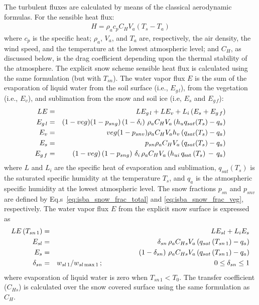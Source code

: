 The turbulent fluxes are calculated by means of the classical
aerodynamic formulas.  For the sensible heat flux:
\begin{eqnarray}
H = \rho_a c_p C_H V_a (T_s - T_a) \label{eqnH}
\end{eqnarray}
where $c_p$ is the specific heat; $\rho_a$, $V_a$, and $T_a$
are, respectively, the air density, the wind speed, and the
temperature at the lowest atmospheric level; and $C_H$,
as discussed below, is the
drag coefficient depending upon the thermal stability of the
atmosphere. The explicit snow scheme sensible heat flux
is calculated using the same formulation (but with $T_{sn}$).
The water vapor flux $E$ is the sum of the evaporation
of liquid water
from the soil surface (i.e., $E_{g\,l}$), from the vegetation (i.e., $E_v$),
and sublimation from the snow and soil ice (i.e, $E_s$ and $E_{g\,f}$):
%
\begin{eqnarray}
LE &=& LE_{g\,l} + LE_v + L_i \left(E_s + E_{g\,f}\right) \\
E_{g\,l} &=& (1-veg)(1-p_{sng})\left(1-\delta_i\right)\, \rho_a C_H V_a
        \left( h_u q_{sat}(T_s) - q_a \right) \label{eqnLEG} \\
E_v &=& veg (1-p_{snv}) \rho_a C_H V_a h_v
        \left( q_{sat}(T_s) - q_a \right) \\
E_s &=& p_{sn} \rho_a C_H V_a
        \left( q_{sat}(T_s) - q_a \right) \\
E_{g\,f} &=&
\,\left(1-veg\right)\left(1-p_{sng}\right)\,\delta_i\, \rho_a C_H V_a
\left( h_{ui} \,q_{\rm sat}\left(T_s\right) \,-\, q_a \right)
\end{eqnarray}
where $L$ and $L_i$ are the specific heat of evaporation
and sublimation, $q_{sat}(T_s)$ is the saturated
specific humidity at the
temperature $T_s$, and $q_a$ is the atmospheric specific humidity
at the lowest atmospheric level. The snow fractions $p_{sn}$ and
$p_{snv}$
are defined by Eq.s~\ref{eq:isba_snow_frac_total} 
and \ref{eq:isba_snow_frac_veg}, respectively.
%
The water vapor flux $E$
from the explicit snow surface is expressed as
%
\begin{eqnarray}
LE\left(T_{sn\,1}\right) &=& L E_{sl} + L_i E_s \\
E_{sl} &=& \delta_{sn} \,\rho_a C_{Hs} V_a
        \left( q_{sat}\left(T_{sn\,1}\right) - q_a \right) \\
E_s &=& \left(1-\delta_{sn}\right) \,
        \rho_a C_{Hs} V_a \left( q_{sat}\left(T_{sn\,1}\right) - q_a \right) \\
\delta_{sn} &=& w_{sl\,1}/w_{sl\,{\rm max}\,1}\,;
\hskip2.2in
0 \leq \delta_{sn} \leq 1
\end{eqnarray}
%
where evaporation of liquid water is zero when $T_{sn\,1}<T_0$.
The transfer coefficient ($C_{Hs}$) is calculated over the snow
covered surface using the same formulation as $C_H$.

